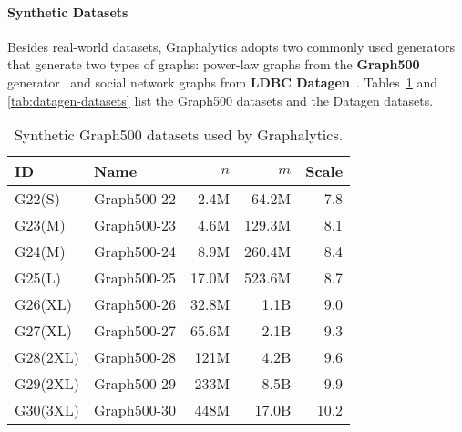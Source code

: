 \paragraph{Synthetic Datasets} Besides real-world datasets, Graphalytics adopts two commonly used generators that generate two types of graphs: power-law graphs from the \textbf{Graph500} generator~\cite{chakrabarti2004, murphy2010} and social network graphs from \textbf{LDBC Datagen}~\cite{DBLP:conf/sigmod/ErlingALCGPPB15}. Tables~\ref{tab:graph500-datasets} and \ref{tab:datagen-datasets} list the Graph500 datasets and the Datagen datasets.



\begin{table}[h]
\centering
\begin{tabular}{|l|l|r|r|r|}
	\hline
	\textbf{ID} & \textbf{Name} &   $n$ &    $m$ & \textbf{Scale} \\ \hline\hline
	G22(S)      & Graph500-22   &  2.4M &  64.2M &            7.8 \\ \hline
	G23(M)      & Graph500-23   &  4.6M & 129.3M &            8.1 \\ \hline
	G24(M)      & Graph500-24   &  8.9M & 260.4M &            8.4 \\ \hline
	G25(L)      & Graph500-25   & 17.0M & 523.6M &            8.7 \\ \hline
	G26(XL)     & Graph500-26   & 32.8M &   1.1B &            9.0 \\ \hline
	G27(XL)     & Graph500-27   & 65.6M &   2.1B &            9.3 \\ \hline
	G28(2XL)    & Graph500-28   &  121M &   4.2B &            9.6 \\ \hline
	G29(2XL)    & Graph500-29   &  233M &   8.5B &            9.9 \\ \hline
	G30(3XL)    & Graph500-30   &  448M &  17.0B &           10.2 \\ \hline
\end{tabular}
\caption{Synthetic Graph500 datasets used by Graphalytics.}
\label{tab:graph500-datasets}
\end{table}


